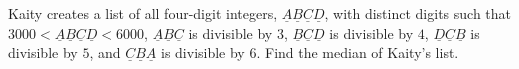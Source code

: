 Kaity creates a list of all four-digit integers, $\underline{A} \underline{B} \underline{C} \underline{D}$, with distinct digits such that $3000 < \underline{A} \underline{B} \underline{C} \underline{D} < 6000$, $\underline{A} \underline{B} \underline{C}$ is divisible by $3$, $\underline{B} \underline{C} \underline{D}$ is divisible by $4$, $\underline{D} \underline{C} \underline{B}$ is divisible by $5$, and $\underline{C} \underline{B} \underline{A}$ is divisible by $6$. Find the median of Kaity's list.
